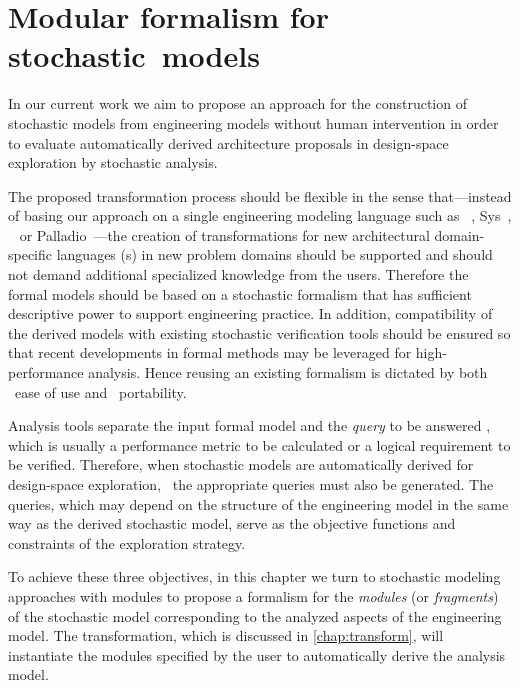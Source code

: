 \chapter{Modular formalism for stochastic~models}
\label{chap:rgspn}

In our current work we aim to propose an approach for the construction of stochastic models from engineering models without human intervention in order to evaluate automatically derived architecture proposals in design-space exploration by stochastic analysis.

The proposed transformation process should be flexible in the sense that---instead of basing our approach on a single engineering modeling language such as ~\citep{Rumbaugh04uml}, Sys~\citep{Friedenthal16sysml}, ~\citep{Feiler12aadl} or Palladio~\citep{Becker08palladio}---the creation of transformations for new architectural domain-specific languages (s) in new problem domains should be supported and should not demand additional specialized knowledge from the users. Therefore the formal models should be based on a stochastic formalism that has sufficient descriptive power to support engineering practice. In addition, compatibility of the derived models with existing stochastic verification tools should be ensured so that recent developments in formal methods may be leveraged for high-performance analysis. Hence reusing an existing formalism is dictated by both ~ease of use and ~portability.

Analysis tools separate the input formal model and the \emph{query} to be answered , which is usually a performance metric to be calculated or a logical requirement to be verified. Therefore, when stochastic models are automatically derived for design-space exploration, ~the appropriate queries must also be generated. The queries, which may depend on the structure of the engineering model in the same way as the derived stochastic model, serve as the objective functions and constraints of the exploration strategy.

To achieve these three objectives, in this chapter we turn to stochastic modeling approaches with modules to propose a formalism for the \emph{modules} (or \emph{fragments}) of the stochastic model corresponding to the analyzed aspects of the engineering model. The transformation, which is discussed in \cref{chap:transform}, will instantiate the modules specified by the user to automatically derive the analysis model.

